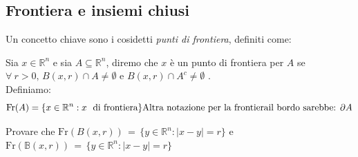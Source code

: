 \subsection{Frontiera e insiemi chiusi}

Un concetto chiave sono i cosidetti \emph{punti di frontiera}, definiti come:
%
\begin{definition}[\textcolor{blue}{punti di frontiera}]
	Sia $x \in \mathbb{R}^n$ e sia $A \subseteq \mathbb{R}^n$, diremo che $x$ è un punto di frontiera per $A$ se $\forall\ r > 0,\, B(x, r) \cap A \neq \emptyset$  e  $B(x, r) \cap A^c \neq \emptyset$ . \\
	Definiamo:
	\[
	\text{Fr}(A)=\{x \in \mathbb{R}^n : x\ \text{ di frontiera} \}\\
	\text{Altra notazione per la frontiera\/il bordo sarebbe:  } \partial A
	\]
\end{definition}
%
\vspace{0.5cm}
\begin{exercise}
	Provare che 
	$\text{Fr}(B(x, r))\, =\, \{y \in \mathbb{R}^n : |x-y| = r \}$ 
	e 
	$\text{Fr} ( \mathbb{B}(x, r))\, =\, \{y \in \mathbb{R}^n : |x-y| = r \}$
\end{exercise}
%
